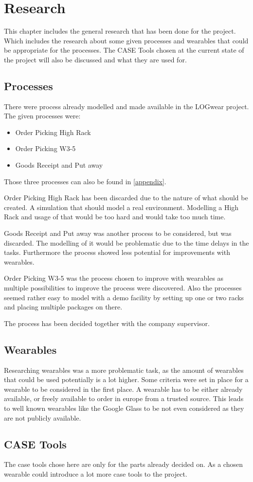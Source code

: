 \chapter{Research}\label{cha:research}
This chapter includes the general research that has been done for the project. Which includes the research about some given processes and wearables that could be appropriate for the processes. The CASE Tools chosen at the current state of the project will also be discussed and what they are used for.

\section{Processes}\label{sec:processes}
There were process already modelled and made available in the LOGwear project. The given processes were:

\begin{itemize}
	\item Order Picking High Rack
	\item Order Picking W3-5
	\item Goods Receipt and Put away
\end{itemize}

Those three processes can also be found in \ref{appendix}.

Order Picking High Rack has been discarded due to the nature of what should be created. A simulation that should model a real environment. Modelling a High Rack and usage of that would be too hard and would take too much time.

Goods Receipt and Put away was another process to be considered, but was discarded. The modelling of it would be problematic due to the time delays in the tasks. Furthermore the process showed less potential for improvements with wearables.

Order Picking W3-5 was the process chosen to improve with wearables as multiple possibilities to improve the process were discovered. Also the processes seemed rather easy to model with a demo facility by setting up one or two racks and placing multiple packages on there.

The process has been decided together with the company supervisor.

\section{Wearables}\label{sec:wearables}
Researching wearables was a more problematic task, as the amount of wearables that could be used potentially is a lot higher. Some criteria were set in place for a wearable to be considered in the first place. A wearable has to be either already available, or freely available to order in europe from a trusted source. This leads to well known wearables like the Google Glass to be not even considered as they are not publicly available.


\section{CASE Tools}\label{sec:caseTools}
The \gls{case} tools chose here are only for the parts already decided on. As a chosen wearable could introduce a lot more \gls{case} tools to the project. 